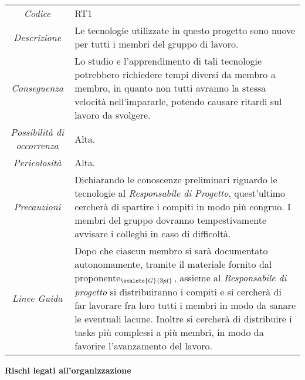 \def\tabularxcolumn#1{m{#1}}
{
	
	\begin{center}
		\renewcommand{\arraystretch}{1.4}
		\begin{tabularx}{\textwidth}{|c|X|}
			\hline
			\rowcolor{airforceblue}
			\multicolumn{2}{|c|}{\textit{Inesperienza tecnologica}}\\
			\hline
			\textit{Codice} & RT1 \\
			\hline
			\textit{Descrizione} & Le tecnologie utilizzate in questo progetto sono nuove per tutti i membri del gruppo di lavoro. \\
			\hline
			\textit{Conseguenza} & Lo studio e l'apprendimento di tali tecnologie potrebbero richiedere tempi diversi da membro a membro, in quanto non tutti avranno la stessa velocità nell'impararle, potendo causare ritardi sul lavoro da svolgere. \\
			\hline
			\textit{Possibilità di occorrenza} & Alta. \\
			\hline
			\textit{Pericolosità} & Alta. \\
			\hline
			\textit{Precauzioni} & Dichiarando le conoscenze preliminari riguardo le tecnologie al \textit{Responsabile di Progetto}, quest'ultimo cercherà di spartire i compiti in modo più congruo.
			I membri del gruppo dovranno tempestivamente avvisare i colleghi in caso di difficoltà.  \\
			\hline
			\textit{Linee Guida} & Dopo che ciascun membro si sarà documentato autonomamente, tramite il materiale fornito dal proponente$_{\scaleto{G}{3pt}}$, assieme al \textit{Responsabile di progetto} si distribuiranno i compiti e si cercherà di far lavorare fra loro tutti i membri in modo da sanare le eventuali lacune.
			Inoltre si cercherà di distribuire i tasks più complessi a più membri, in modo da favorire l'avanzamento del lavoro.  \\
			\hline
		\end{tabularx}
	\end{center}

\quad
\begin{center}
	\LARGE\textbf{Rischi legati all'organizzazione}
\end{center}

\def\tabularxcolumn#1{m{#1}}
{
	
}}
